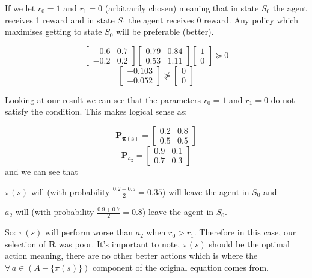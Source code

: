 \documentclass{article}
\begin{document}
    If we let $r_0 = 1$ and $r_1 = 0$ (arbitrarily chosen) meaning that in state $S_0$ the agent receives 1 reward and in state $S_1$ the agent receives 0 reward. Any policy which maximises getting to state $S_0$ will be preferable (better).
    
    $$
    \begin{bmatrix}
        -0.6 & 0.7 \\
        -0.2 & 0.2 
    \end{bmatrix} 
        \begin{bmatrix}
            0.79 & 0.84 \\
            0.53 & 1.11 
        \end{bmatrix}
    \begin{bmatrix}
        1 \\
        0 
    \end{bmatrix} \succeq 0 
    $$
    $$
    \begin{bmatrix}
        -0.103 \\
        -0.052 
    \end{bmatrix} \not \succeq 
    \begin{bmatrix}
        0 \\
        0 
    \end{bmatrix}
    $$

    Looking at our result we can see that the parameters $r_0=1$ and $r_1=0$ do not satisfy the condition. This makes logical sense as: 
    
    $$
    \mathbf{P_{\pi(s)}} = \begin{bmatrix}
        0.2 & 0.8 \\
        0.5 & 0.5 
    \end{bmatrix}
    $$
    $$
    \mathbf{P}_{a_2} = \begin{bmatrix}
        0.9 & 0.1 \\
        0.7 & 0.3 
    \end{bmatrix}
    $$
    and we can see that 
    
    $\pi(s)$ will (with probability $\frac{0.2+0.5}{2} = 0.35$) will leave the agent in $S_0$  and
    
    $a_2$ will (with probability $\frac{0.9+0.7}{2} = 0.8$) leave the agent in $S_0$.

    So: $\pi(s)$ will perform worse than $a_2$ when $r_0 > r_1$. Therefore in this case, our selection of $\mathbf{R}$ was poor.
    It's important to note, $\pi(s)$ should be the optimal action meaning, there are no other better actions which is where the $\forall \, a \in (A - \{\pi(s)\})$ component of the original equation comes from.
\end{document}
